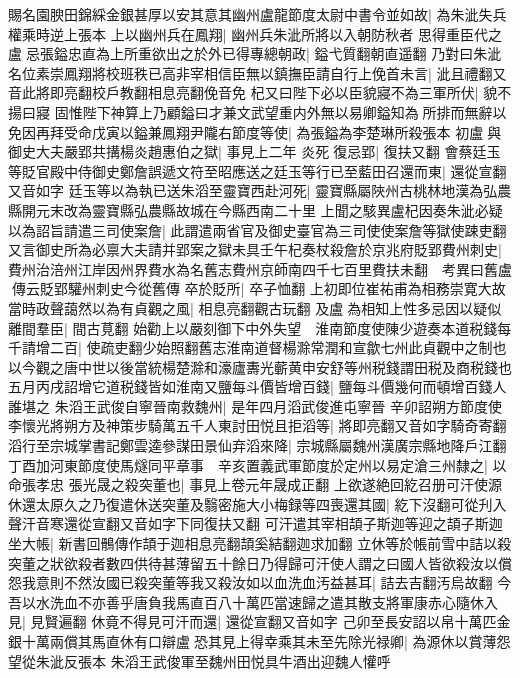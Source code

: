 賜名園腴田錦綵金銀甚厚以安其意其幽州盧龍節度太尉中書令並如故|{
	為朱泚失兵權乘時逆上張本}
上以幽州兵在鳳翔|{
	幽州兵朱泚所將以入朝防秋者}
思得重臣代之盧忌張鎰忠直為上所重欲出之於外已得專總朝政|{
	鎰弋質翻朝直遥翻}
乃對曰朱泚名位素崇鳳翔將校班秩已高非宰相信臣無以鎮撫臣請自行上俛首未言|{
	泚且禮翻又音此將即亮翻校戶教翻相息亮翻俛音免}
杞又曰陛下必以臣貌寢不為三軍所伏|{
	貌不揚曰寢}
固惟陛下神算上乃顧鎰曰才兼文武望重内外無以易卿鎰知為所排而無辭以免因再拜受命戊寅以鎰兼鳳翔尹隴右節度等使|{
	為張鎰為李楚琳所殺張本}
初盧與御史大夫嚴郢共搆楊炎趙惠伯之獄|{
	事見上二年}
炎死復忌郢|{
	復扶又翻}
會蔡廷玉等貶官殿中侍御史鄭詹誤遞文符至昭應送之廷玉等行已至藍田召還而東|{
	還從宣翻又音如字}
廷玉等以為執已送朱滔至靈寶西赴河死|{
	靈寶縣屬陜州古桃林地漢為弘農縣開元末改為靈寶縣弘農縣故城在今縣西南二十里}
上聞之駭異盧杞因奏朱泚必疑以為詔旨請遣三司使案詹|{
	此謂遣兩省官及御史臺官為三司使使案詹等獄使踈吏翻}
又言御史所為必禀大夫請并郢案之獄未具壬午杞奏杖殺詹於京兆府貶郢費州刺史|{
	費州治涪州江岸因州界費水為名舊志費州京師南四千七百里費扶未翻　考異曰舊盧傳云貶郢驩州刺史今從舊傳}
卒於貶所|{
	卒子恤翻}
上初即位崔祐甫為相務崇寛大故當時政聲藹然以為有貞觀之風|{
	相息亮翻觀古玩翻}
及盧為相知上性多忌因以疑似離間羣臣|{
	間古莧翻}
始勸上以嚴刻御下中外失望　淮南節度使陳少遊奏本道税錢每千請增二百|{
	使疏吏翻少始照翻舊志淮南道督楊滁常潤和宣歙七州此貞觀中之制也以今觀之唐中世以後當統楊楚滁和濠廬夀光蘄黄申安舒等州税錢謂田税及商税錢也}
五月丙戌詔增它道税錢皆如淮南又鹽每斗價皆增百錢|{
	鹽每斗價幾何而頓增百錢人誰堪之}
朱滔王武俊自寧晉南救魏州|{
	是年四月滔武俊進屯寧晉}
辛卯詔朔方節度使李懷光將朔方及神策步騎萬五千人東討田悦且拒滔等|{
	將即亮翻又音如字騎奇寄翻}
滔行至宗城掌書記鄭雲逵參謀田景仙弃滔來降|{
	宗城縣屬魏州漢廣宗縣地降戶江翻}
丁酉加河東節度使馬燧同平章事　辛亥置義武軍節度於定州以易定滄三州隸之|{
	以命張孝忠}
張光晟之殺突董也|{
	事見上卷元年晟成正翻}
上欲遂絶回紇召册可汗使源休還太原久之乃復遣休送突董及翳密施大小梅録等四喪還其國|{
	紇下沒翻可從刋入聲汗音寒還從宣翻又音如字下同復扶又翻}
可汗遣其宰相頡子斯迦等迎之頡子斯迦坐大帳|{
	新書回鶻傳作頡于迦相息亮翻頡奚結翻迦求加翻}
立休等於帳前雪中詰以殺突董之狀欲殺者數四供待甚薄留五十餘日乃得歸可汗使人謂之曰國人皆欲殺汝以償怨我意則不然汝國已殺突董等我又殺汝如以血洗血汚益甚耳|{
	詰去吉翻汚烏故翻}
今吾以水洗血不亦善乎唐負我馬直百八十萬匹當速歸之遣其散支將軍康赤心隨休入見|{
	見賢遍翻}
休竟不得見可汗而還|{
	還從宣翻又音如字}
己卯至長安詔以帛十萬匹金銀十萬兩償其馬直休有口辯盧恐其見上得幸乘其未至先除光禄卿|{
	為源休以賞薄怨望從朱泚反張本}
朱滔王武俊軍至魏州田悦具牛酒出迎魏人懽呼

